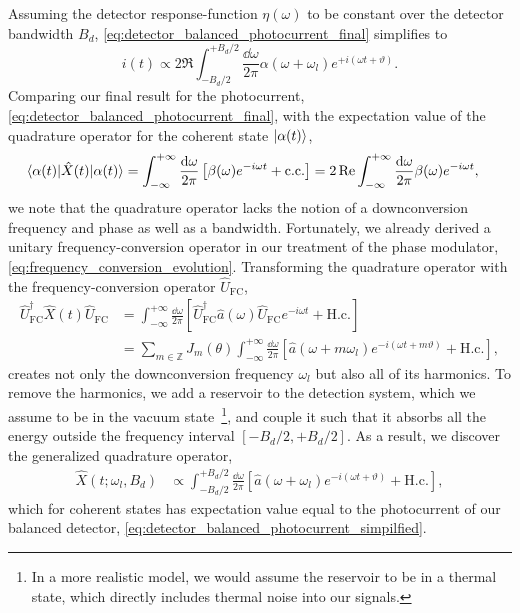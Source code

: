 Assuming the detector response-function $\eta(\omega)$ to be constant over the detector bandwidth $B_d$, \cref{eq:detector_balanced_photocurrent_final} simplifies to
\begin{equation}
	i(t)
	\propto
	2\Re
	\int_{-B_d/2}^{+B_d/2}
	\frac{\dd{\omega}}{2\pi}
	\alpha(\omega+\omega_l)
	e^{+i(\omega t+\vartheta)}
	.
	\label{eq:detector_balanced_photocurrent_simpilfied}
\end{equation}
Comparing our final result for the photocurrent, \cref{eq:detector_balanced_photocurrent_final}, with the expectation value of the quadrature operator for the coherent state $\lvert\alpha(t)\rangle$,
\begin{equation}
	\begin{split}
		\bra{\alpha(t)}
		\hat{X}(t)
		\ket{\alpha(t)}
		&=
		\int_{-\infty}^{+\infty}
		\frac{\dd{\omega}}{2\pi}
		\left[
			\beta(\omega)
			e^{-i\omega t}
			+
			\text{c.c.}
		\right]
		=
		2\Re
		\int_{-\infty}^{+\infty}
		\frac{\dd{\omega}}{2\pi}
		\beta(\omega)
		e^{-i\omega t}
		,
	\end{split}
\end{equation}
we note that the quadrature operator lacks the notion of a downconversion frequency and phase as well as a bandwidth.
Fortunately, we already derived a unitary frequency-conversion operator in our treatment of the phase modulator, \cref{eq:frequency_conversion_evolution}.
Transforming the quadrature operator with the frequency-conversion operator $\hat{U}_\text{FC}$,
\begin{equation}
	\begin{split}
		\hat{U}_\text{FC}^\dagger
		\hat{X}(t)
		\hat{U}_\text{FC}
		&=
		\int_{-\infty}^{+\infty}
		\frac{\dd{\omega}}{2\pi}
		\left[
			\hat{U}_\text{FC}^\dagger
			\hat{a}(\omega)
			\hat{U}_\text{FC}
			e^{-i\omega t}
			+
			\text{H.c.}
		\right]
		\\
		&=
		\sum_{m\in\mathbb{Z}}
		J_m(\theta)
		\int_{-\infty}^{+\infty}
		\frac{\dd{\omega}}{2\pi}
		\left[
			\hat{a}(\omega+m\omega_l)
			e^{-i(\omega t+m\vartheta)}
			+
			\text{H.c.}
		\right]
		,
	\end{split}
\end{equation}
creates not only the downconversion frequency $\omega_l$ but also all of its harmonics.
To remove the harmonics, we add a reservoir to the detection system, which we assume to be in the vacuum state~\footnote{In a more realistic model, we would assume the reservoir to be in a thermal state, which directly includes thermal noise into our signals.}, and couple it such that it absorbs all the energy outside the frequency interval $[-B_d/2,+B_d/2]$.
As a result, we discover the generalized quadrature operator,
\begin{equation}
	\begin{split}
		\hat{X}(t;\omega_l,B_d)
		&\propto
		\int_{-B_d/2}^{+B_d/2}
		\frac{\dd{\omega}}{2\pi}
		\left[
			\hat{a}(\omega+\omega_l)
			e^{-i(\omega t+\vartheta)}
			+
			\text{H.c.}
		\right]
		,
	\end{split}
\end{equation}
which for coherent states has expectation value equal to the photocurrent of our balanced detector, \cref{eq:detector_balanced_photocurrent_simpilfied}.